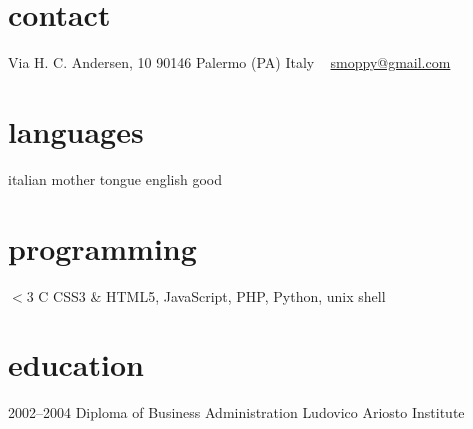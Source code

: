 \documentclass[]{friggeri-cv} %
\begin{document}


\begin{aside} %
\section{contact}
Via H. C. Andersen, 10
90146 Palermo (PA)
Italy
~
\href{mailto:smoppy@gmail.com}{smoppy@gmail.com}
\section{languages}
italian mother tongue
english good
\section{programming}
{\color{red} $<3$} C
CSS3 \& HTML5,
JavaScript, PHP, Python, unix shell
\end{aside}

\section{education}
\begin{entrylist}
\entry
{2002--2004}
{Diploma {\normalfont of Business Administration}}
{Ludovico Ariosto Institute}
{}
\end{entrylist}

\end{document}
